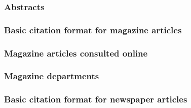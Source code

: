 \documentclass[11pt,letterpaper,oneside]{article}
\begin{document}
\subsubsection{Abstracts}

\begin{citebib}
\item \cite{matute2015}
\end{citebib}

\setcounter{subsubsection}{187}
\subsubsection{Basic citation format for magazine articles}

\begin{citebib}
\item \cite[48]{saulnier2008}
\item \cite[59]{lepore2015}
\end{citebib}

\subsubsection{Magazine articles consulted online}

\begin{citebib}
\item \cite{vick2015}
\item \cite[5]{hanemann1926}
\end{citebib}

\subsubsection{Magazine departments}

\begin{citebib}
\item \cite{marx2015}
\item \cite{wallraff2008}
\item \cite{gourmet2000}
\end{citebib}

\subsubsection{Basic citation format for newspaper articles}
\end{document}

